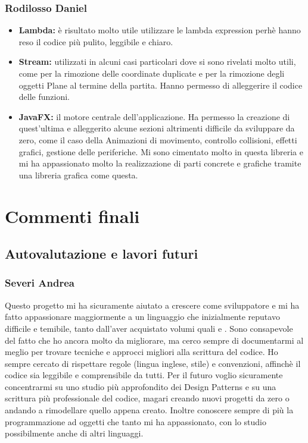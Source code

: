 \documentclass[a4paper,12pt]{report}
\begin{document}
\subsection{Rodilosso Daniel}
\begin{itemize}
    \item \textbf{Lambda:} è risultato molto utile utilizzare le lambda expression perhè hanno reso il codice più pulito, leggibile e chiaro.
    \item \textbf{Stream:} utilizzati in alcuni casi particolari dove si sono rivelati molto utili, come per la rimozione delle coordinate duplicate e 
    per la rimozione degli oggetti Plane al termine della partita. Hanno permesso di alleggerire il codice delle funzioni.
    \item \textbf{JavaFX:}  il motore centrale dell’applicazione. Ha permesso la creazione di quest’ultima e alleggerito alcune sezioni altrimenti difficile da sviluppare da zero, come il caso della Animazioni di movimento, controllo collisioni, effetti grafici, gestione delle periferiche. Mi sono cimentato molto in questa libreria e mi ha appassionato molto la realizzazione di parti concrete e grafiche tramite una libreria grafica come questa.
\end{itemize}

\chapter{Commenti finali}

\section{Autovalutazione e lavori futuri}
\subsection{Severi Andrea}
Questo progetto mi ha sicuramente aiutato a crescere come sviluppatore e mi ha fatto appassionare maggiormente a un linguaggio che inizialmente reputavo difficile e temibile, tanto dall'aver acquistato volumi quali \href{https://www.amazon.it/Effective-Java-Joshua-Bloch/dp/0134685997}{} e \href{https://it.wikipedia.org/wiki/Design_Patterns}{}. Sono consapevole del fatto che ho ancora molto da migliorare, ma cerco sempre di documentarmi al meglio per trovare tecniche e approcci migliori alla scrittura del codice. Ho sempre cercato di rispettare regole (lingua inglese, stile) e convenzioni, affinchè il codice sia leggibile e comprensibile da tutti. Per il futuro voglio sicuramente concentrarmi su uno studio più approfondito dei Design Patterns e su una scrittura più professionale del codice, magari creando nuovi progetti da zero o andando a rimodellare quello appena creato. Inoltre conoscere sempre di più la programmazione ad oggetti che tanto mi ha appassionato, con lo studio possibilmente anche di altri linguaggi.
\end{document}

